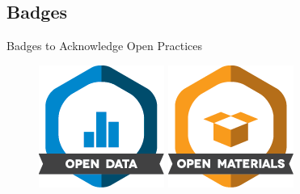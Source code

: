 \documentclass{beamer}
\begin{document}
\subsection{Badges}
\begin{frame}{Badges to Acknowledge Open Practices}
\begin{figure}
\includegraphics[width=0.9\linewidth]{data.png}

\includegraphics[width=0.9\linewidth]{materials.png}


\end{figure}
\end{frame}
\end{document}

